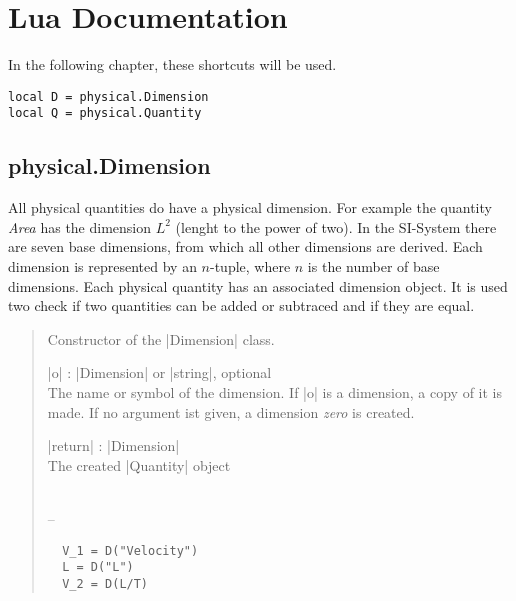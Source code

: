 \documentclass{ltxdoc}
\begin{document}
\newpage
\section{Lua Documentation}

In the following chapter, these shortcuts will be used.
\begin{lstlisting}
local D = physical.Dimension
local Q = physical.Quantity
\end{lstlisting}



\subsection{physical.Dimension}

 All physical quantities do have a physical dimension. For example the quantity \emph{Area} has the dimension $L^2$ (lenght to the power of two). In the SI-System there are seven base dimensions, from which all other dimensions are derived. Each dimension is represented by an $n$-tuple, where $n$ is the number of base dimensions. Each physical quantity has an associated dimension object. It is used two check if two quantities can be added or subtraced and if they are equal. 


\begin{quote}
  Constructor of the |Dimension| class.

  \subtitle{Parameters}
  \begin{description}
  \item |o| : |Dimension| or |string|, optional\\
    The name or symbol of the dimension. If |o| is a dimension, a copy of it is made. If no argument ist given, a dimension \emph{zero} is created.

  \item |return| : |Dimension|\\
    The created |Quantity| object
  \end{description}

  \subtitle{Notes}\\
  --

  \subtitle{Examples}
  \begin{lstlisting}
  V_1 = D("Velocity")
  L = D("L")
  V_2 = D(L/T)
  \end{lstlisting}
\end{quote}
\end{document}
